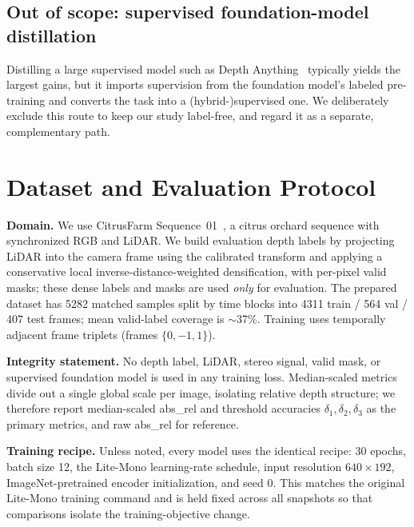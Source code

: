 \documentclass[conference]{IEEEtran}
\begin{document}
\subsection{Out of scope: supervised foundation-model distillation}
Distilling a large supervised model such as Depth
Anything~\cite{yang2024depthanything} typically yields the largest gains, but it
imports supervision from the foundation model's labeled pre-training and converts the
task into a (hybrid-)supervised one. We deliberately exclude this route to keep our
study label-free, and regard it as a separate, complementary path.

\section{Dataset and Evaluation Protocol}
\label{sec:data}
\textbf{Domain.} We use CitrusFarm Sequence~01~\cite{citrusfarm}, a citrus
orchard sequence with synchronized RGB and LiDAR. We build evaluation depth
labels by projecting LiDAR into the camera frame using the calibrated transform
and applying a conservative local inverse-distance-weighted densification, with
per-pixel valid masks; these dense labels and masks are used \emph{only} for
evaluation. The prepared dataset has 5282 matched samples split by time blocks
into 4311 train / 564 val / 407 test frames; mean valid-label coverage is
$\sim$37\%. Training uses temporally adjacent frame triplets (frames
$\{0,-1,1\}$).

\textbf{Integrity statement.} No depth label, LiDAR, stereo signal, valid mask,
or supervised foundation model is used in any training loss. Median-scaled
metrics divide out a single global scale per image, isolating relative depth
structure; we therefore report median-scaled abs\_rel and threshold accuracies
$\delta_1,\delta_2,\delta_3$ as the primary metrics, and raw abs\_rel for
reference.

\textbf{Training recipe.} Unless noted, every model uses the identical recipe:
30 epochs, batch size 12, the Lite-Mono learning-rate schedule, input resolution
$640\times192$, ImageNet-pretrained encoder initialization, and seed 0. This
matches the original Lite-Mono training command and is held fixed across all
snapshots so that comparisons isolate the training-objective change.

\end{document}
